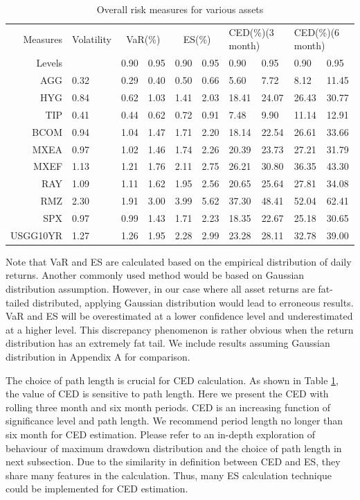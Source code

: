 \documentclass[11pt]{article}
\begin{document}
\begin{table}[bp]
\centering 
\begin{tabular}{ | r || p{1.5cm} | p{1cm} p{1cm} | p{1cm} p{1cm} | p{1cm} p{1cm} | p{1cm} p{1cm} | } 
 \hline
Measures & Volatility & \multicolumn{2}{c|}{VaR(\%)} & \multicolumn{2}{c|}{ES(\%)} &
 \multicolumn{2}{p{2cm}|}{CED(\%)\quad(3 month)} &\multicolumn{2}{p{2cm}|}{CED(\%)\quad(6 month)} \\ 
Levels & & 0.90 & 0.95 & 0.90 & 0.95 & 0.90 & 0.95 & 0.90 & 0.95 \\
  \hline \hline
AGG & 0.32 & 0.29 & 0.40 & 0.50 & 0.66 & 5.60 &  7.72 & 8.12 & 11.45  \\ 
HYG & 0.84 &  0.62 & 1.03 & 1.41 & 2.03 & 18.41 & 24.07 & 26.43 & 30.77 \\ 
TIP & 0.41 &  0.44 & 0.62 & 0.72 & 0.91 & 7.48 & 9.90 & 11.14 & 12.91 \\ 
BCOM & 0.94 &  1.04 & 1.47 & 1.71 & 2.20 & 18.14 & 22.54 & 26.61 & 33.66 \\ 
MXEA & 0.97 &  1.02 & 1.46 & 1.74 & 2.26 & 20.39 & 23.73 & 27.21 & 31.79 \\ 
MXEF & 1.13 &  1.21 & 1.76 & 2.11 & 2.75 & 26.21 & 30.80 & 36.35 & 43.30 \\ 
RAY & 1.09 &  1.11 & 1.62 & 1.95 & 2.56 & 20.65 & 25.64 & 27.81 & 34.08 \\ 
RMZ & 2.30 &  1.91 & 3.00 & 3.99 & 5.62 & 37.30 & 48.41 & 52.04 & 62.41 \\ 
SPX & 0.97 &  0.99 & 1.43 & 1.71 & 2.23 & 18.35 & 22.67 & 25.18 & 30.65 \\ 
USGG10YR & 1.27 & 1.26 & 1.95 & 2.28 & 2.99 & 23.28 & 28.11 & 32.78 & 39.00 \\
 \hline
\end{tabular}
\caption{Overall risk measures for various assets}
\label{table:Overall_risk}
\end{table}

Note that VaR and ES are calculated based on the empirical distribution of daily returns. Another commonly used method would be based on Gaussian distribution assumption. However, in our case where all asset returns are fat-tailed distributed, applying Gaussian distribution would lead to erroneous results. VaR and ES will be overestimated at a lower confidence level and underestimated at a higher level. This discrepancy phenomenon is rather obvious when the return distribution has an extremely fat tail. We include results assuming Gaussian distribution in Appendix A for comparison.
 
The choice of path length is crucial for CED calculation. As shown in Table \ref{table:Overall_risk}, the value of CED is sensitive to path length. Here we present the CED with rolling three month and six month periods. CED is an increasing function of significance level and path length. We recommend period length no longer than six month for CED estimation. Please refer to an in-depth exploration of behaviour of maximum drawdown distribution and the choice of path length in next subsection. Due to the similarity in definition between CED and ES, they share many features in the calculation. Thus, many ES calculation technique could be implemented for CED estimation. 
\end{document}
